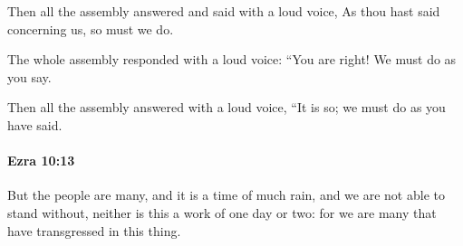 			\begin{versebox}
					\item[BHS] 
					\item[LXX] 
					\item[ASV] Then all the assembly answered and said with a loud voice, As thou hast said concerning us, so must we do.
					\item[NIV] The whole assembly responded with a loud voice: “You are right! We must do as you say.
					\item[NRSV] Then all the assembly answered with a loud voice, “It is so; we must do as you have said.
			\end{versebox}

		\paragraph{Ezra 10:13} %
			\label{EZRA-10-13}

			But the people are many, and it is a time of much rain, and we are not able to stand without, neither is this a work of one day or two: for we are many that have transgressed in this thing.

